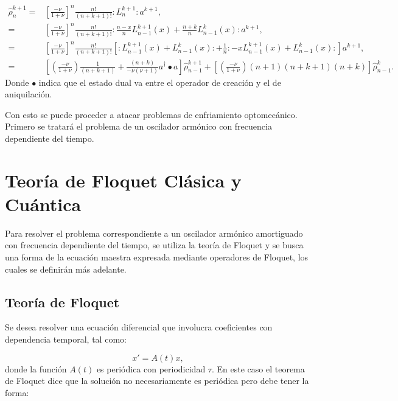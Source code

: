 \documentclass[a4paper,10pt]{report}
\begin{document}
\begin{align}
\hat{\rho}_n ^{k+1} =& [\frac{-\nu}{1+\nu}]^n \frac{n!}{(n+k+1)!} :L_n^{k+1}:a^{k+1},\\
=&[\frac{-\nu}{1+\nu}]^n\frac{n!}{(n+k+1)!} :\frac{n-x}{n}L_{n-1}^{k+1}(x) + \frac{n+k}{n}L_{n-1}^{k}(x):a^{k+1},\\
=&[\frac{-\nu}{1+\nu}]^n\frac{n!}{(n+k+1)!}[:L_{n-1}^{k+1}(x)+L_{n-1}^{k}(x):+\frac{1}{n}:-xL_{n-1}^{k+1}(x)+L_{n-1}^{k}(x):]a^{k+1},\\
=&[(\frac{-\nu}{1+\nu})\frac{1}{(n+k+1)}+ \frac{(n+k)}{-\nu(\nu+1)}a^\dagger \bullet a]\hat{\rho}_{n-1} ^{k+1} + [(\frac{-\nu}{1+\nu}) (n+1)(n+k+1)(n+k)]\hat{\rho}_{n-1} ^{k}.
\end{align} Donde $\bullet$ indica que el estado dual va entre el operador de creación y el de aniquilación.

Con esto se puede proceder a atacar problemas de enfriamiento optomecánico. Primero se tratará el problema de un oscilador armónico con frecuencia dependiente del tiempo.


\chapter{Teoría de Floquet Clásica y Cuántica}

Para resolver el problema correspondiente a un oscilador armónico amortiguado con frecuencia dependiente del tiempo, se utiliza la teoría de Floquet \cite{WardFT}y se busca una forma de la ecuación maestra expresada mediante operadores de Floquet, los cuales se definirán más adelante.

\section{Teoría de Floquet}

Se desea resolver una ecuación diferencial que involucra coeficientes con dependencia temporal, tal como:

\begin{equation}\label{FloquetEquation}
x' = A(t)x,
\end{equation} donde la función $A(t)$ es periódica con periodicidad $\tau$. En este caso el teorema de Floquet\cite{WardFT} dice que la solución no necesariamente es periódica pero debe tener la forma:
\end{document}
